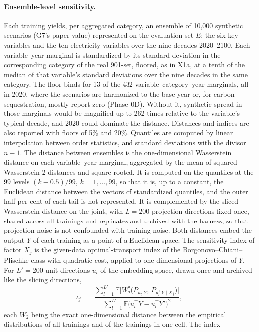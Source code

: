 \documentclass[11pt,a4paper]{article}
\begin{document}
\paragraph{Ensemble-level sensitivity.} Each training yields, per
aggregated category, an ensemble of 10{,}000 synthetic scenarios (G7's
paper value) represented on the evaluation set $E$: the six key variables
and the ten electricity variables over the nine decades 2020--2100. Each
variable--year marginal is standardized by its standard deviation in
the corresponding category of the real 901-set, floored, as in X1a,
at a tenth of the median of that variable's standard deviations over the
nine decades in the same category. The floor binds for 13 of the 432
variable--category--year marginals, all in 2020, where the scenarios are
harmonized to the base year or, for carbon sequestration, mostly report
zero (Phase~0D). Without it, synthetic spread in those marginals would be
magnified up to 262 times relative to the variable's typical decade, and
2020 could dominate the distance. Distances and indices are also reported
with floors of 5\% and 20\%. Quantiles are computed by linear
interpolation between order statistics, and standard deviations with the
divisor $n-1$. The distance between ensembles is the one-dimensional
Wasserstein distance on each variable--year marginal, aggregated by the
mean of squared Wasserstein-2 distances and square-rooted. It is
computed on the quantiles at the 99 levels $(k-0.5)/99$, $k=1,\dots,99$,
so that it is, up to a constant, the Euclidean distance between the
vectors of standardized quantiles, and the outer half per cent of each
tail is not represented. It is complemented by the sliced Wasserstein
distance on the joint, with $L=200$ projection directions fixed once,
shared across all trainings and replicates and archived with the harness,
so that projection noise is not confounded with training noise.
Both distances embed the output $Y$ of each training as a point of a
Euclidean space. The sensitivity index of factor $X_j$ is the given-data
optimal-transport index of the Borgonovo--Chiani--Plischke class with
quadratic cost, applied to one-dimensional projections of $Y$. For
$L'=200$ unit directions $u_l$ of the embedding space, drawn once and
archived like the slicing directions,
\[
\iota_j \;=\; \frac{\sum_{l=1}^{L'}\mathbb{E}\big[W_2^2\big(P_{u_l^{\top}Y},\,P_{u_l^{\top}Y\mid X_j}\big)\big]}
{\sum_{l=1}^{L'}\mathbb{E}\big(u_l^{\top}Y-u_l^{\top}Y'\big)^2},
\]
each $W_2$ being the exact one-dimensional distance between the empirical
distributions of all trainings and of the trainings in one cell. The index
\end{document}
